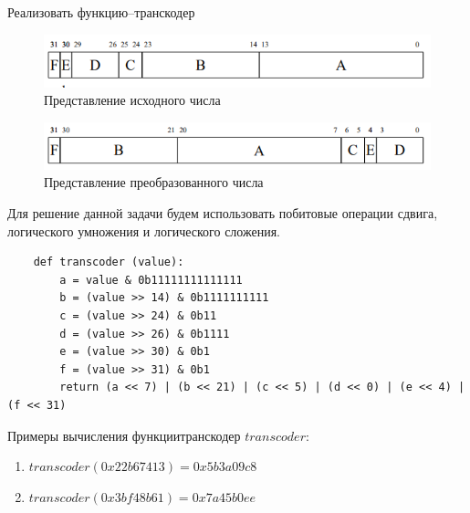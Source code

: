 \documentclass[a4paper,14pt]{extarticle}
\begin{document}
\begin{problem}
	 Реализовать функцию--­транскодер
	 	\begin{figure}[h!]
		 	\begin{center}
		 		\includegraphics[width=0.8\linewidth]{transcode1}
		 		\caption{Представление исходного числа}\label{pic:2.2.1}
		 	\end{center}	
	 	\end{figure}

 	\begin{figure}[h!]
 	\begin{center}
 		\includegraphics[width=0.8\linewidth]{transcode2}
 		\caption{Представление преобразованного числа}\label{pic:2.2.2}
 	\end{center}	
 \end{figure}
\end{problem}

\begin{nonum}
	Для решение данной задачи будем использовать побитовые операции сдвига, логического умножения и логического сложения.
	\vspace{3ex}
	\begin{lstlisting}
	def transcoder (value):
		a = value & 0b11111111111111
		b = (value >> 14) & 0b1111111111
		c = (value >> 24) & 0b11
		d = (value >> 26) & 0b1111
		e = (value >> 30) & 0b1
		f = (value >> 31) & 0b1
		return (a << 7) | (b << 21) | (c << 5) | (d << 0) | (e << 4) | (f << 31)
	\end{lstlisting}
	
	Примеры вычисления функции­транскодер $transcoder$:
	\begin{enumerate}
		\item $transcoder(0x22b67413) = 0x5b3a09c8$
		\item $transcoder(0x3bf48b61) = 0x7a45b0ee$
	\end{enumerate}
\end{nonum}
\end{document}
